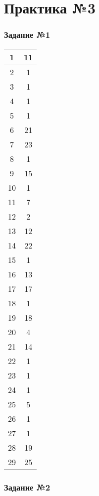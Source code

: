 \documentclass[a4paper, 12pt]{article}
\begin{document}
	\part*{Практика №3}
	\section{Задание №1}
	\begin{center}
		\begin{tabular}{ | c | c | }
			\hline
			1 & 11 \\
			\hline
			2 & 1 \\
			\hline
			3 & 1 \\
			\hline
			4 & 1 \\
			\hline
			5 & 1 \\
			\hline
			6 & 21 \\
			\hline
			7 & 23 \\
			\hline
			8 & 1 \\
			\hline
			9 & 15 \\
			\hline
			10 & 1 \\
			\hline
			11 & 7 \\
			\hline
			12 & 2 \\
			\hline
			13 & 12 \\
			\hline
			14 & 22 \\
			\hline
			15 & 1 \\
			\hline
			16 & 13 \\
			\hline
			17 & 17 \\
			\hline
			18 & 1 \\
			\hline
			19 & 18 \\
			\hline
			20 & 4 \\
			\hline
			21 & 14 \\
			\hline
			22 & 1 \\
			\hline
			23 & 1 \\
			\hline
			24 & 1 \\
			\hline
			25 & 5 \\
			\hline
			26 & 1 \\
			\hline
			27 & 1 \\
			\hline
			28 & 19 \\
			\hline
			29 & 25 \\
			\hline
		\end{tabular}
	\end{center}

	\section{Задание №2}
	
\end{document}
